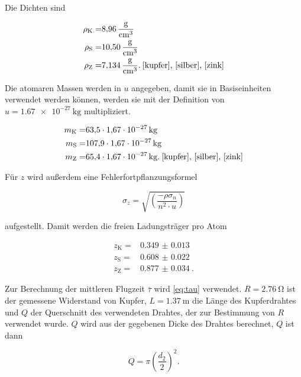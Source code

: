 Die Dichten sind

\begin{align}
    \rho _\text{K} =& \SI{8.96}{\gram\per\cubic\centi\meter} \\
    \rho _\text{S} =& \SI{10.50}{\gram\per\cubic\centi\meter} \\
    \rho _\text{Z} =& \SI{7.134}{\gram\per\cubic\centi\meter}.\:\text{\cite{kupfer}, \cite{silber}, \cite{zink}}
    \label{eq:rho}
\end{align}

Die atomaren Massen werden in $u$ angegeben, damit sie in Basiseinheiten verwendet werden können, werden sie mit der Definition von $u = \SI{1.67e-27}{\kilo\gram}$ multipliziert.\cite{physics_constants}

\begin{align}
    m_\text{K} =& \SI{63.5}{} \cdot \SI{1.67e-27}{\kilo\gram} \\
    m_\text{S} =& \SI{107.9}{} \cdot \SI{1.67e-27}{\kilo\gram} \\
    m_\text{Z} =& \SI{65.4}{} \cdot \SI{1.67e-27}{\kilo\gram}.\:\text{\cite{kupfer}, \cite{silber}, \cite{zink}}
    \label{eq:m}
\end{align}

Für $z$ wird außerdem eine Fehlerfortpflanzungsformel

\begin{equation}
   \sigma _z = \sqrt{\left(\frac{-\rho \sigma _n}{n^2 \cdot u}\right)}
    \label{eq:nproatom_fehler}
\end{equation}

aufgestellt.
Damit werden die freien Ladungsträger pro Atom

\begin{align*}
    z_\text{K} =& \SI{0.349(13)}{} \\
    z_\text{S} =& \SI{0.608(22)}{} \\
    z_\text{Z} =& \SI{0.877(34)}{}.
\end{align*}

Zur Berechnung der mittleren Flugzeit $\bar{\tau}$ wird \autoref{eq:tau} verwendet.
$R = \SI{2.76}{\ohm}$ ist der gemessene Widerstand von Kupfer, $L = \SI{1.37}{\meter}$ die Länge des Kupferdrahtes und $Q$ der Querschnitt des verwendeten Drahtes, der zur Bestimmung von $R$ verwendet wurde.
$Q$ wird aus der gegebenen Dicke des Drahtes berechnet, $Q$ ist dann

\begin{equation}
    Q = \pi \left(\frac{d_2}{2}\right)^2.
    \label{eq:Q}
\end{equation}

